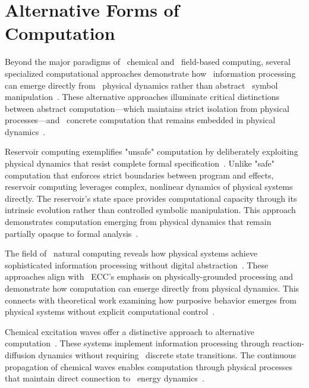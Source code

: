 \section{Alternative Forms of Computation~}

Beyond the major paradigms of~ chemical and~ field-based computing, several specialized computational approaches demonstrate how~ information processing can emerge directly from~ physical dynamics rather than abstract~ symbol manipulation~\cite{Adamatzky2021,anderson2024physical,harnad1990symbol}. These alternative approaches illuminate critical distinctions between abstract computation—which maintains strict isolation from physical processes—and~ concrete computation that remains embedded in physical dynamics~\cite{fodor2000mind,polger2016multiple}.

 Reservoir computing exemplifies "unsafe" computation by deliberately exploiting physical dynamics that resist complete formal specification~\cite{Braund2020,Jaeger2021,hasson2015hierarchical}. Unlike "safe" computation that enforces strict boundaries between program and effects, reservoir computing leverages complex, nonlinear dynamics of physical systems directly. The reservoir's state space provides computational capacity through its intrinsic evolution rather than controlled symbolic manipulation. This approach demonstrates computation emerging from physical dynamics that remain partially opaque to formal analysis~\cite{breakspear2005dynamics,Bicknell2021}.

The field of~ natural computing reveals how physical systems achieve sophisticated information processing without digital abstraction~\cite{Calude2018a,Toffoli2019,Thompson2007}. These approaches align with~ ECC's emphasis on physically-grounded processing and demonstrate how computation can emerge directly from physical dynamics. This connects with theoretical work examining how purposive behavior emerges from physical systems without explicit computational control~\cite{Deacon2019,juarrero2023context}.

 Chemical excitation waves offer a distinctive approach to alternative computation~\cite{Gorecki2020,Lyon2021,Freeman2006nonlinear}. These systems implement information processing through reaction-diffusion dynamics without requiring~ discrete state transitions. The continuous propagation of chemical waves enables computation through physical processes that maintain direct connection to~ energy dynamics~\cite{akhlaghpour2022rna,kukushkin2024massed}.

